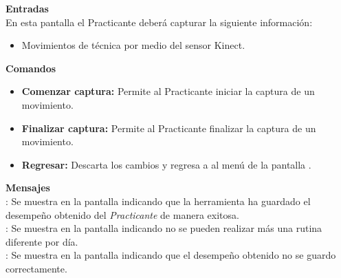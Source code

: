 \textbf{\textcolor[rgb]{0, 0, 0.545098}{Entradas}}\\
En esta pantalla el Practicante deberá capturar la siguiente información:

\begin{itemize}
	\item Movimientos de técnica por medio del sensor Kinect.
\end{itemize}
\vspace{1em}

\textbf{\textcolor[rgb]{0, 0, 0.545098}{Comandos}}
\begin{itemize}
	\item \textbf{\textcolor[rgb]{0, 0, 0.545098}{Comenzar captura:}} Permite al Practicante iniciar la captura de un movimiento.
	\item \textbf{\textcolor[rgb]{0, 0, 0.545098}{Finalizar captura:}} Permite al Practicante finalizar la captura de un movimiento.
	\item \textbf{\textcolor[rgb]{0, 0, 0.545098}{Regresar:}} Descarta los cambios y regresa a al menú de la pantalla .
\end{itemize}

\vspace{1em}

\textbf{\textcolor[rgb]{0, 0, 0.545098}{Mensajes}}\\
	
\textbf{}: Se muestra en la pantalla  indicando que la herramienta ha guardado el desempeño obtenido del \textit{Practicante} de manera exitosa.\\
 
\textbf{}: Se muestra en la pantalla  indicando no se pueden realizar más una rutina diferente por día.\\

\textbf{}: Se muestra en la pantalla  indicando que el desempeño obtenido no se guardo correctamente.\\


\clearpage